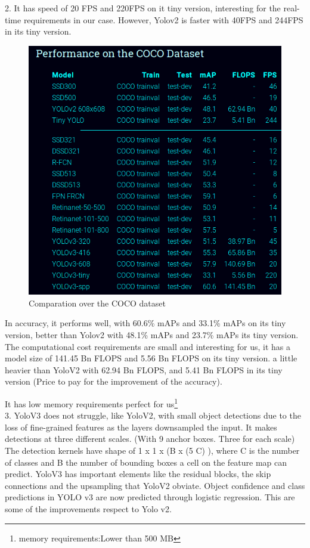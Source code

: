 \documentclass[10pt]{article}
\begin{document}
2. It has speed of 20 FPS and 220FPS on it tiny version, interesting for the real-time requirements in our case. However, Yolov2 is faster with 40FPS and 244FPS in its tiny version. 

\begin{figure}[H]
  	\centering
    \includegraphics[scale=0.5]{yoloCOCO.png}
    \caption{ Comparation over the COCO dataset\cite{redmon2018yolov3}}
\end{figure}

In accuracy, it performs well, with 60.6\% mAPs and 33.1\% mAPs on its tiny version, better than Yolov2 with 48.1\% mAPs and 23.7\% mAPs its tiny version. The computational cost requirements are small and interesting for us, it has a model size of 141.45 Bn FLOPS and 5.56 Bn FLOPS on its tiny version. a little heavier than YoloV2 with  62.94 Bn FLOPS, and 5.41 Bn FLOPS in its tiny version (Price to pay for the improvement of the accuracy). 

It has low memory requirements perfect for us\footnote{memory requirements:Lower than 500 MB}\\



3. YoloV3 does not struggle, like YoloV2, with small object detections due to the loss of fine-grained features as the layers downsampled the input. It makes detections at three different scales. (With 9 anchor boxes. Three for each scale) The detection kernels have shape of 1 x 1 x (B x (5 \+ C) ), where C is the number of classes and B the number of bounding boxes a cell on the feature map can predict. YoloV3 has important elements like the residual blocks, the skip connections and the upsampling that YoloV2 obviate. Object confidence and class predictions in YOLO v3 are now predicted through logistic regression. This are some of the improvements respect to Yolo v2.
\end{document}

